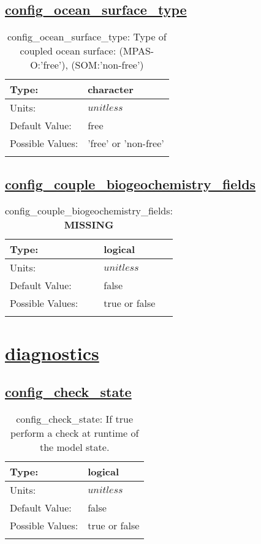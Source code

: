 \subsection[config\_ocean\_surface\_type]{\hyperref[sec:nm_tab_ocean]{config\_ocean\_surface\_type}}
\label{subsec:nm_sec_config_ocean_surface_type}
\begin{center}
\begin{longtable}{| p{2.0in} || p{4.0in} |}
    \hline
    Type: & character \\
    \hline
    Units: & $unitless$ \\
    \hline
    Default Value: & free \\
    \hline
    Possible Values: & 'free' or 'non-free' \\
    \hline
    \caption{config\_ocean\_surface\_type: Type of coupled ocean surface: (MPAS-O:'free'), (SOM:'non-free')}
\end{longtable}
\end{center}
\subsection[config\_couple\_biogeochemistry\_fields]{\hyperref[sec:nm_tab_ocean]{config\_couple\_biogeochemistry\_fields}}
\label{subsec:nm_sec_config_couple_biogeochemistry_fields}
\begin{center}
\begin{longtable}{| p{2.0in} || p{4.0in} |}
    \hline
    Type: & logical \\
    \hline
    Units: & $unitless$ \\
    \hline
    Default Value: & false \\
    \hline
    Possible Values: & true or false \\
    \hline
    \caption{config\_couple\_biogeochemistry\_fields: {\bf \color{red} MISSING}}
\end{longtable}
\end{center}
\section[diagnostics]{\hyperref[sec:nm_tab_diagnostics]{diagnostics}}
\label{sec:nm_sec_diagnostics}
\subsection[config\_check\_state]{\hyperref[sec:nm_tab_diagnostics]{config\_check\_state}}
\label{subsec:nm_sec_config_check_state}
\begin{center}
\begin{longtable}{| p{2.0in} || p{4.0in} |}
    \hline
    Type: & logical \\
    \hline
    Units: & $unitless$ \\
    \hline
    Default Value: & false \\
    \hline
    Possible Values: & true or false \\
    \hline
    \caption{config\_check\_state: If true perform a check at runtime of the model state.}
\end{longtable}
\end{center}
